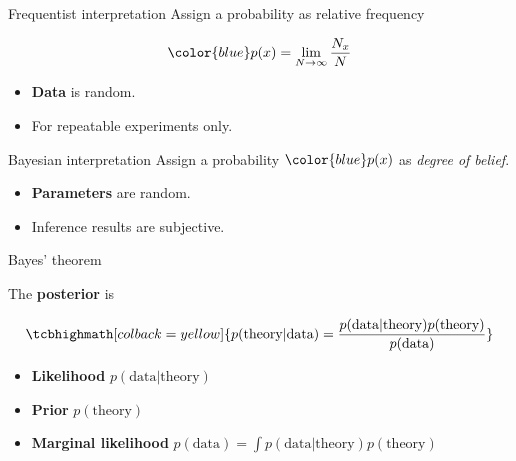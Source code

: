 \documentclass[
aspectratio=169,
14pt,
professionalfonts
]{beamer}
\begin{document}
\begin{frame}{Frequentist interpretation}
    Assign a probability as relative frequency

        $$ \color{blue}
        p(x) = \lim_{N\to\infty} \frac{N_x}{N}
        $$

        \begin{itemize}
            \item \textbf{Data} is random.
            \item For repeatable experiments only.
        \end{itemize}
\end{frame}

\begin{frame}{Bayesian interpretation}
    Assign a probability $\color{blue} p(x)$ as \textit{degree of belief}.
    \begin{itemize}
        \item \textbf{Parameters} are random.
        \item Inference results are subjective.
    \end{itemize}
\end{frame}

\begin{frame}{Bayes' theorem}

The \textbf{posterior} is

$$
\tcbhighmath[colback=yellow]{
p(\text{theory} | \text{data}) = \frac{p(\text{data}|\text{theory}) p(\text{theory})}{p(\text{data})}
}
$$

\begin{itemize}
    \item \textbf{Likelihood} $p(\text{data}|\text{theory})$
    \item \textbf{Prior} $p(\text{theory})$
    \item \textbf{Marginal likelihood} ${p(\text{data}) = \int p(\text{data}|\text{theory}) p(\text{theory})}$
\end{itemize}
\end{frame}
\end{document}
